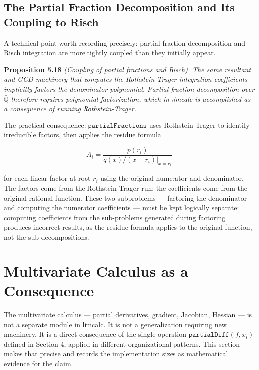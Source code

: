 \documentclass[12pt]{article}
\begin{document}
\subsection{The Partial Fraction Decomposition and Its Coupling
to
Risch}\label{the-partial-fraction-decomposition-and-its-coupling-to-risch}

A technical point worth recording precisely: partial fraction
decomposition and Risch integration are more tightly coupled than they
initially appear.

\textbf{Proposition 5.18} \emph{(Coupling of partial fractions and
Risch).} \emph{The same resultant and GCD machinery that computes the
Rothstein-Trager integration coefficients implicitly factors the
denominator polynomial. Partial fraction decomposition over
\(\bar{\mathbb{Q}}\) therefore requires polynomial factorization, which
in limcalc is accomplished as a consequence of running
Rothstein-Trager.}

The practical consequence: \(\mathtt{partialFractions}\) uses
Rothstein-Trager to identify irreducible factors, then applies the
residue formula

\[A_i = \frac{p(r_i)}{q(x)/(x - r_i)\big|_{x=r_i}}\]

for each linear factor at root \(r_i\) using the original numerator and
denominator. The factors come from the Rothstein-Trager run; the
coefficients come from the original rational function. These two
subproblems --- factoring the denominator and computing the numerator
coefficients --- must be kept logically separate: computing coefficients
from the sub-problems generated during factoring produces incorrect
results, as the residue formula applies to the original function, not
the sub-decompositions.




\section{Multivariate Calculus as a
Consequence}\label{multivariate-calculus-as-a-consequence}

The multivariate calculus --- partial derivatives, gradient, Jacobian,
Hessian --- is not a separate module in limcalc. It is not a
generalization requiring new machinery. It is a direct consequence of
the single operation \(\mathtt{partialDiff}(f, x_i)\) defined in Section
4, applied in different organizational patterns. This section makes that
precise and records the implementation sizes as mathematical evidence
for the claim.
\end{document}
